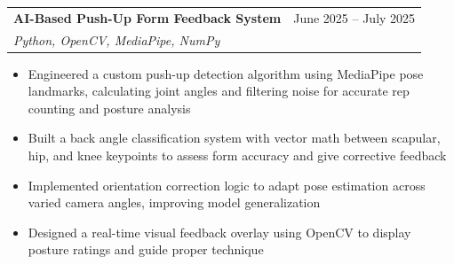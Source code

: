 \documentclass[letterpaper,10pt]{article}
\makeatletter
\newcommand{\resumeItem}[1]{\item\small{#1}}
\newcommand{\resumeSubheading}[4]{
  \item
  \begin{tabular*}{0.97\textwidth}{l@{\extracolsep{\fill}}r}
    \textbf{#1} & #2 \\
    \textit{\small #3} & \textit{\small #4} \\
  \end{tabular*}\vspace{-3pt}
}
\newcommand{\resumeItemListStart}{\begin{itemize}[leftmargin=*, itemsep=1pt]}
\newcommand{\resumeItemListEnd}{\end{itemize}\vspace{-4pt}}
\makeatother
\begin{document}
 \resumeSubheading
    {AI-Based Push-Up Form Feedback System}{June 2025 -- July 2025}
    {Python, OpenCV, MediaPipe, NumPy}{}
    \resumeItemListStart
      \resumeItem{Engineered a custom push-up detection algorithm using MediaPipe pose landmarks, calculating joint angles and filtering noise for accurate rep counting and posture analysis}
      \resumeItem{Built a back angle classification system with vector math between scapular, hip, and knee keypoints to assess form accuracy and give corrective feedback}
      \resumeItem{Implemented orientation correction logic to adapt pose estimation across varied camera angles, improving model generalization}
      \resumeItem{Designed a real-time visual feedback overlay using OpenCV to display posture ratings and guide proper technique}
    \resumeItemListEnd

\end{document}
